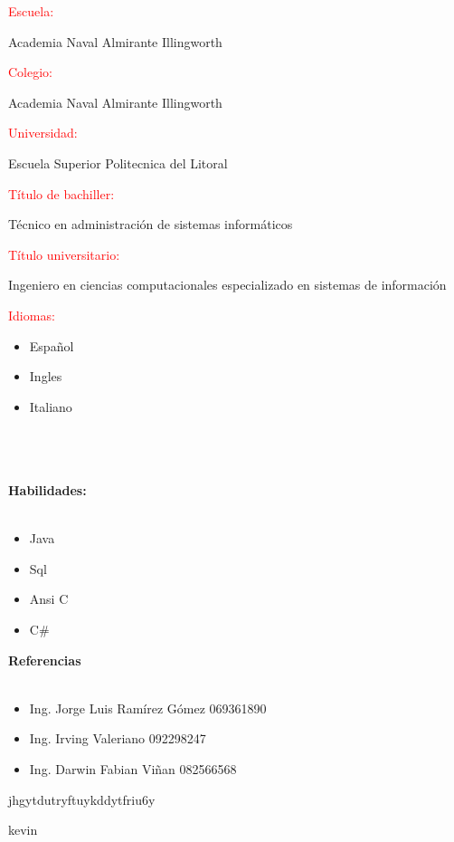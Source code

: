\documentclass[20pt]{article}
\begin{document}
\begin{large}
\textcolor{red}{Escuela:}
\end{large}
Academia Naval Almirante Illingworth\\

\begin{large}
\textcolor{red}{Colegio:}
\end{large}
Academia Naval Almirante Illingworth\\

\begin{large}
\textcolor{red}{Universidad:}
\end{large}
Escuela Superior Politecnica del Litoral\\

\begin{large}
\textcolor{red}{Título de bachiller:}
\end{large}
Técnico en administración de sistemas informáticos\\

\begin{large}
\textcolor{red}{Título universitario:}
\end{large}
Ingeniero en ciencias computacionales especializado en sistemas de información\\

\begin{large}
\textcolor{red}{Idiomas:}
\end{large}
\begin{itemize}
\item Español
\item Ingles
\item Italiano\\\\\\\\
\end{itemize}

\begin{center}
\begin{huge}
\textbf{Habilidades:}\\\
\end{huge}
\end{center}
\begin{itemize}
\item Java
\item Sql
\item Ansi C
\item C\#\\
\end{itemize}


\begin{center}
\begin{huge}
\textbf{Referencias}\\\
\end{huge}
\end{center}

\begin{itemize}
\item Ing. Jorge Luis Ramírez Gómez 		069361890
\item Ing. Irving Valeriano			092298247
\item Ing. Darwin Fabian Viñan 		082566568
\end{itemize}





jhgytdutryftuykddytfriu6y

kevin
\end{document}
